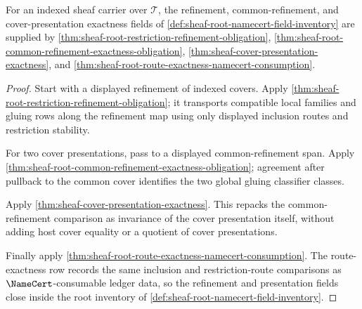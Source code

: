 \begin{theorem}
\label{thm:sheaf-root-namecert-refinement-exactness-fields}
For an indexed sheaf carrier over $\mathcal{T}$, the refinement, common-refinement, and cover-presentation exactness fields of \autoref{def:sheaf-root-namecert-field-inventory} are supplied by \autoref{thm:sheaf-root-restriction-refinement-obligation}, \autoref{thm:sheaf-root-common-refinement-exactness-obligation}, \autoref{thm:sheaf-cover-presentation-exactness}, and \autoref{thm:sheaf-root-route-exactness-namecert-consumption}.
\end{theorem}
\begin{proof}
Start with a displayed refinement of indexed covers. Apply \autoref{thm:sheaf-root-restriction-refinement-obligation}; it transports compatible local families and gluing rows along the refinement map using only displayed inclusion routes and restriction stability.

For two cover presentations, pass to a displayed common-refinement span. Apply \autoref{thm:sheaf-root-common-refinement-exactness-obligation}; agreement after pullback to the common cover identifies the two global gluing classifier classes.

Apply \autoref{thm:sheaf-cover-presentation-exactness}. This repacks the common-refinement comparison as invariance of the cover presentation itself, without adding host cover equality or a quotient of cover presentations.

Finally apply \autoref{thm:sheaf-root-route-exactness-namecert-consumption}. The route-exactness row records the same inclusion and restriction-route comparisons as $\NameCert$-consumable ledger data, so the refinement and presentation fields close inside the root inventory of \autoref{def:sheaf-root-namecert-field-inventory}.
\end{proof}
